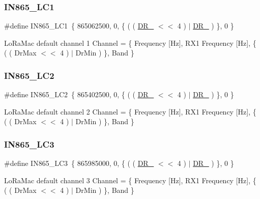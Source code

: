 \subsubsection{\texorpdfstring{I\+N865\+\_\+\+L\+C1}{IN865\_LC1}}
{\footnotesize\ttfamily \#define I\+N865\+\_\+\+L\+C1~\{ 865062500, 0, \{ ( ( \hyperlink{group__REGION_ga872e12c82020c02a7f70a1c6ed1375df}{D\+R\+\_} $<$$<$ 4 ) $\vert$ \hyperlink{group__REGION_ga6c4ef966b4f3d5eb7597b087f2b97095}{D\+R\+\_} ) \}, 0 \}}

Lo\+Ra\+Mac default channel 1 Channel = \{ Frequency \mbox{[}Hz\mbox{]}, R\+X1 Frequency \mbox{[}Hz\mbox{]}, \{ ( ( Dr\+Max $<$$<$ 4 ) $\vert$ Dr\+Min ) \}, Band \} \mbox{\label{group__REGIONIN865_ga737c986f456a7cc50b7efcbae64da6a0}} 
\subsubsection{\texorpdfstring{I\+N865\+\_\+\+L\+C2}{IN865\_LC2}}
{\footnotesize\ttfamily \#define I\+N865\+\_\+\+L\+C2~\{ 865402500, 0, \{ ( ( \hyperlink{group__REGION_ga872e12c82020c02a7f70a1c6ed1375df}{D\+R\+\_} $<$$<$ 4 ) $\vert$ \hyperlink{group__REGION_ga6c4ef966b4f3d5eb7597b087f2b97095}{D\+R\+\_} ) \}, 0 \}}

Lo\+Ra\+Mac default channel 2 Channel = \{ Frequency \mbox{[}Hz\mbox{]}, R\+X1 Frequency \mbox{[}Hz\mbox{]}, \{ ( ( Dr\+Max $<$$<$ 4 ) $\vert$ Dr\+Min ) \}, Band \} \mbox{\label{group__REGIONIN865_ga6808f21aa6b28f6d31d32bc44c3ee52a}} 
\subsubsection{\texorpdfstring{I\+N865\+\_\+\+L\+C3}{IN865\_LC3}}
{\footnotesize\ttfamily \#define I\+N865\+\_\+\+L\+C3~\{ 865985000, 0, \{ ( ( \hyperlink{group__REGION_ga872e12c82020c02a7f70a1c6ed1375df}{D\+R\+\_} $<$$<$ 4 ) $\vert$ \hyperlink{group__REGION_ga6c4ef966b4f3d5eb7597b087f2b97095}{D\+R\+\_} ) \}, 0 \}}

Lo\+Ra\+Mac default channel 3 Channel = \{ Frequency \mbox{[}Hz\mbox{]}, R\+X1 Frequency \mbox{[}Hz\mbox{]}, \{ ( ( Dr\+Max $<$$<$ 4 ) $\vert$ Dr\+Min ) \}, Band \} \mbox{\label{group__REGIONIN865_ga8af1e01f501561a336d851c84dbd81b9}} 

